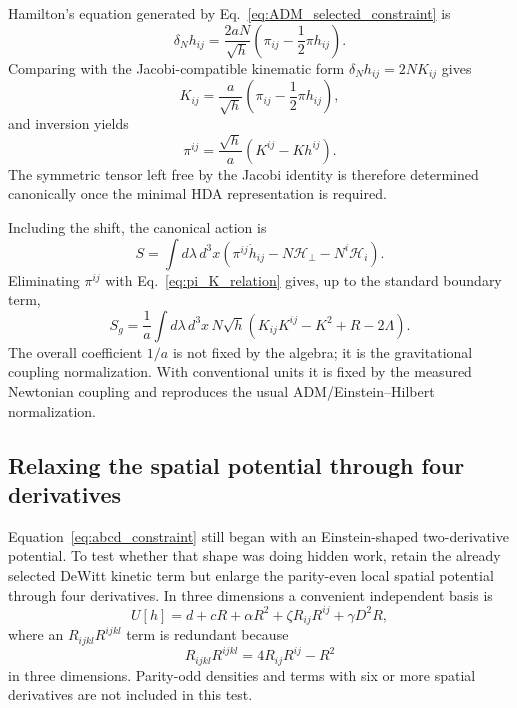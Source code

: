 \documentclass[11pt]{article}
\begin{document}
Hamilton's equation generated by Eq.~\eqref{eq:ADM_selected_constraint} is
\begin{equation}
\boxed{
\delta_Nh_{ij}
=\frac{2aN}{\sqrt h}
\left(\pi_{ij}-\frac12\pi h_{ij}\right).}
\label{eq:h_evolution_canonical}
\end{equation}
Comparing with the Jacobi-compatible kinematic form $\delta_Nh_{ij}=2NK_{ij}$ gives
\begin{equation}
\boxed{
K_{ij}
=\frac{a}{\sqrt h}
\left(\pi_{ij}-\frac12\pi h_{ij}\right),}
\label{eq:K_pi_relation}
\end{equation}
and inversion yields
\begin{equation}
\boxed{
\pi^{ij}
=\frac{\sqrt h}{a}
\left(K^{ij}-Kh^{ij}\right).}
\label{eq:pi_K_relation}
\end{equation}
The symmetric tensor left free by the Jacobi identity is therefore determined canonically once the minimal HDA representation is required.

Including the shift, the canonical action is
\begin{equation}
    S=\int d\lambda\,d^3x
    \left(\pi^{ij}\dot h_{ij}
    -N\mathcal H_\perp-N^i\mathcal H_i\right).
\end{equation}
Eliminating $\pi^{ij}$ with Eq.~\eqref{eq:pi_K_relation} gives, up to the standard boundary term,
\begin{equation}
\boxed{
S_g
=\frac{1}{a}\int d\lambda\,d^3x\,
N\sqrt h\left(
K_{ij}K^{ij}-K^2+R-2\Lambda
\right).}
\label{eq:ADM_reconstructed}
\end{equation}
The overall coefficient $1/a$ is not fixed by the algebra; it is the gravitational coupling normalization. With conventional units it is fixed by the measured Newtonian coupling and reproduces the usual ADM/Einstein--Hilbert normalization.

\subsection{Relaxing the spatial potential through four derivatives}

Equation~\eqref{eq:abcd_constraint} still began with an Einstein-shaped two-derivative potential. To test whether that shape was doing hidden work, retain the already selected DeWitt kinetic term but enlarge the parity-even local spatial potential through four derivatives. In three dimensions a convenient independent basis is
\begin{equation}
\boxed{
U[h]
=d+cR+\alpha R^2+\zeta R_{ij}R^{ij}+\gamma D^2R,}
\label{eq:four_derivative_potential}
\end{equation}
where an $R_{ijkl}R^{ijkl}$ term is redundant because
\begin{equation}
    R_{ijkl}R^{ijkl}=4R_{ij}R^{ij}-R^2
\end{equation}
in three dimensions. Parity-odd densities and terms with six or more spatial derivatives are not included in this test.
\end{document}
